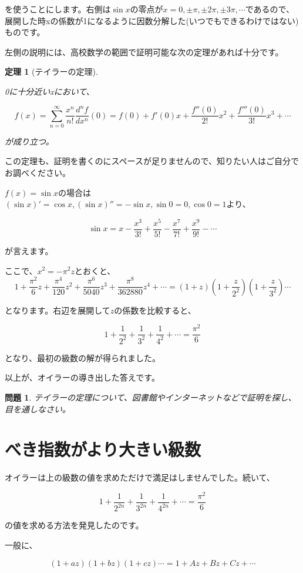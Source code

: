 \documentclass[a4paper]{jsarticle}
\theoremstyle{break}
\newtheorem*{thm}{定理}
\newtheorem*{prb}{問題}
\begin{document}
を使うことにします。右側は$\sin x$の零点が$x=0,\pm \pi,\pm 2\pi,\pm 3\pi,\cdots$であるので、展開した時xの係数が1になるように因数分解した(いつでもできるわけではない)ものです。

左側の説明には、高校数学の範囲で証明可能な次の定理があれば十分です。

\begin{thm}[テイラーの定理]
　

0に十分近いxにおいて、

\[f(x)=\sum_{n=0}^\infty \frac{x^n}{n!}\frac{d^nf}{dx^n}(0)=f(0)+f'(0)x+\frac{f''(0)}{2!}x^2+\frac{f'''(0)}{3!}x^3+\cdots\]

が成り立つ。
\end{thm}
この定理も、証明を書くのにスペースが足りませんので、知りたい人はご自分でお調べください。

$f(x)=\sin x$の場合は$(\sin x)'=\cos x,(\sin x)''=-\sin x,\sin 0=0,\cos 0=1$より、

\[\sin x=x-\frac{x^3}{3!}+\frac{x^5}{5!}-\frac{x^7}{7!}+\frac{x^9}{9!}-\cdots\]

が言えます。

ここで、$x^2=-\pi^2 z$とおくと、
\[1+\frac{\pi^2}{6}z+\frac{\pi^4}{120}z^2+\frac{\pi^6}{5040}z^3+\frac{\pi^8}{362880}z^4+\cdots=\left(  1+z\right)\left(  1+\frac{z}{2^2}\right)\left(  1+\frac{z}{3^2}\right)\cdots\]

となります。右辺を展開して$z$の係数を比較すると、

\[1+\frac{1}{2^2}+\frac{1}{3^2}+\frac{1}{4^2}+\cdots=\frac{\pi^2}{6}\]

となり、最初の級数の解が得られました。

以上が、オイラーの導き出した答えです。

\begin{prb}
テイラーの定理について、図書館やインターネットなどで証明を探し、目を通しなさい。
\end{prb}

\section{べき指数がより大きい級数}
オイラーは上の級数の値を求めただけで満足はしませんでした。続いて、

\[1+\frac{1}{2^{2n}}+\frac{1}{3^{2n}}+\frac{1}{4^{2n}}+\cdots=\frac{\pi^2}{6}\]

の値を求める方法を発見したのです。

一般に、

\[(1+az)(1+bz)(1+cz)\cdots=1+Az+Bz+Cz+\cdots\]
\end{document}
